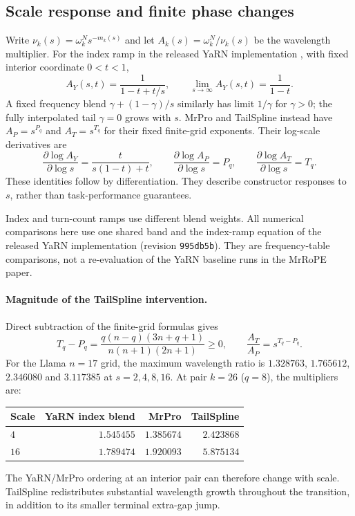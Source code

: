 \subsection{Scale response and finite phase changes}
\label{sec:allocation-scale-response}
Write $\nu_k(s)=\omega_k^N s^{-m_k(s)}$ and let
$A_k(s)=\omega_k^N/\nu_k(s)$ be the wavelength multiplier.
For the index ramp in the released YaRN implementation
\citep{peng2024yarn}, with fixed interior coordinate $0<t<1$,
\begin{equation}
A_Y(s,t)=\frac{1}{1-t+t/s},\qquad
\lim_{s\to\infty}A_Y(s,t)=\frac{1}{1-t}.
\label{eq:yarn-interior-scale-limit}
\end{equation}
A fixed frequency blend $\gamma+(1-\gamma)/s$ similarly has limit
$1/\gamma$ for $\gamma>0$; the fully interpolated tail $\gamma=0$ grows
with $s$. MrPro and TailSpline instead have
$A_P=s^{P_q}$ and $A_T=s^{T_q}$ for their fixed finite-grid exponents.
Their log-scale derivatives are
\begin{equation}
\frac{\partial\log A_Y}{\partial\log s}
=\frac{t}{s(1-t)+t},\qquad
\frac{\partial\log A_P}{\partial\log s}=P_q,\qquad
\frac{\partial\log A_T}{\partial\log s}=T_q.
\label{eq:allocation-scale-derivatives}
\end{equation}
These identities follow by differentiation. They describe constructor
responses to $s$, rather than task-performance guarantees.

Index and turn-count ramps use different blend weights. All numerical
comparisons here use one shared band and the index-ramp equation of the
released YaRN implementation (revision \texttt{995db5b}).
They are frequency-table comparisons, not a re-evaluation of the YaRN
baseline runs in the MrRoPE paper.

\paragraph{Magnitude of the TailSpline intervention.}
Direct subtraction of the finite-grid formulas gives
\begin{equation}
T_q-P_q=\frac{q(n-q)(3n+q+1)}{n(n+1)(2n+1)}\ge0,
\qquad \frac{A_T}{A_P}=s^{T_q-P_q}.
\label{eq:tailspline-wavelength-order}
\end{equation}
For the Llama $n=17$ grid, the maximum wavelength ratio is
$1.328763$, $1.765612$, $2.346080$ and $3.117385$ at $s=2,4,8,16$.
At pair $k=26$ ($q=8$), the multipliers are:
\begin{center}
\begin{tabular}{@{}lrrr@{}}
\toprule
Scale & YaRN index blend & MrPro & TailSpline\\
\midrule
$4$ & $1.545455$ & $1.385674$ & $2.423868$\\
$16$ & $1.789474$ & $1.920093$ & $5.875134$\\
\bottomrule
\end{tabular}
\end{center}
The YaRN/MrPro ordering at an interior pair can therefore change with
scale. TailSpline redistributes substantial wavelength growth throughout
the transition, in addition to its smaller terminal extra-gap jump.

